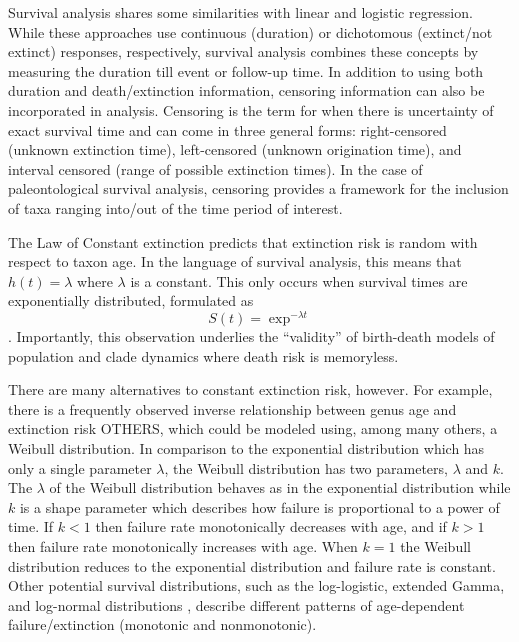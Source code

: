 \documentclass[12pt,letterpaper]{article}
\begin{document}
Survival analysis shares some similarities with linear and logistic regression. While these approaches use continuous (duration) or dichotomous (extinct/not extinct) responses, respectively, survival analysis combines these concepts by measuring the duration till event or follow-up time. In addition to using both duration and death/extinction information, censoring information can also be incorporated in analysis. Censoring is the term for when there is uncertainty of exact survival time and can come in three general forms: right-censored (unknown extinction time), left-censored (unknown origination time), and interval censored (range of possible extinction times). In the case of paleontological survival analysis, censoring provides a framework for the inclusion of taxa ranging into/out of the time period of interest.

The Law of Constant extinction \citep{VanValen1973} predicts that extinction risk is random with respect to taxon age. In the language of survival analysis, this means that \(h(t) = \lambda\) where \(\lambda\) is a constant. This only occurs when survival times are exponentially distributed, formulated as 
\begin{equation}
  S(t) = \exp ^{- \lambda t}
  \label{eq:expsurv}
\end{equation}. Importantly, this observation underlies the ``validity'' of birth-death models of population and clade dynamics where death risk is memoryless.

There are many alternatives to constant extinction risk, however. For example, there is a frequently observed inverse relationship between genus age and extinction risk \citep{Finnegan2008} OTHERS, which could be modeled using, among many others, a Weibull distribution. In comparison to the exponential distribution which has only a single parameter \(\lambda\), the Weibull distribution has two parameters, \(\lambda\) and \(k\). The \(\lambda\) of the Weibull distribution behaves as in the exponential distribution while \(k\) is a shape parameter which describes how failure is proportional to a power of time. If \(k < 1\) then failure rate monotonically decreases with age, and if \(k > 1\) then failure rate monotonically increases with age. When \(k = 1\) the Weibull distribution reduces to the exponential distribution and failure rate is constant. Other potential survival distributions, such as the log-logistic, extended Gamma, and log-normal distributions \citep{Kleinbaum2005}, describe different patterns of age-dependent failure/extinction (monotonic and nonmonotonic).
\end{document}
